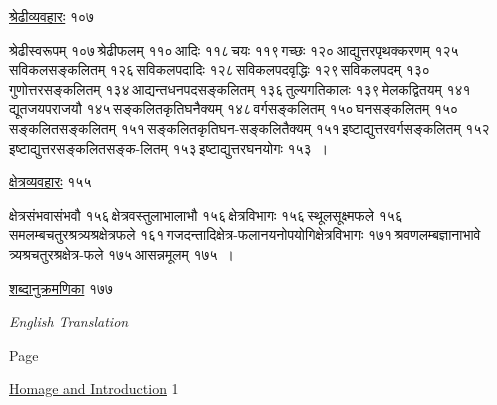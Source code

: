 \documentclass[10pt, openany]{book}
\begin{document}
\vspace{2mm}

\noindent \hyperref[shre]{श्रेढीव्यवहारः}  \hfill १०७

\vspace{2mm}

\begin{minipage}{0.8\textwidth}
 श्रेढीस्वरूपम् १०७\textemdash \,श्रेढीफलम् ११०\textemdash \,आदिः ११८\textemdash \,चयः ११९\textemdash \,गच्छः १२०\textemdash \,आद्युत्तरपृथक्करणम् १२५\textemdash \,सविकलसङ्कलितम् १२६\textemdash \,सविकलपदादिः १२८\textemdash \,सविकलपदवृद्धिः १२९\textemdash \,सविकलपदम् १३०\textemdash \,गुणोत्तरसङ्कलितम् १३४\textemdash \,आद्यन्तधनपदसङ्कलितम् १३६\textemdash \,तुल्यगतिकालः १३९\textemdash \,मेलकद्वितयम् १४१\textemdash \,द्यूतजयपराजयौ १४५\textemdash \,सङ्कलितकृतिघनैक्यम् १४८\textemdash \,वर्गसङ्कलितम् १५०\textemdash \,घनसङ्कलितम् १५०\textemdash \,सङ्कलितसङ्कलितम् १५१\textemdash \,सङ्कलितकृतिघन-सङ्कलितैक्यम् १५१\textemdash \,इष्टाद्युत्तरवर्गसङ्कलितम् १५२\textemdash \,इष्टाद्युत्तरसङ्कलितसङ्क-लितम् १५३\textemdash \,इष्टाद्युत्तरघनयोगः १५३~। 
\end{minipage}


\vspace{2mm}

\noindent \hyperref[kshe]{क्षेत्रव्यवहारः} \hfill १५५  

\vspace{2mm}

\begin{minipage}{0.8\textwidth}
 क्षेत्रसंभवासंभवौ १५६\textemdash \,क्षेत्रवस्तुलाभालाभौ १५६\textemdash \,क्षेत्रविभागः १५६\textemdash \,स्थूलसूक्ष्मफले १५६\textemdash \,समलम्बचतुरश्रत्र्यश्रक्षेत्रफले १६१\textemdash \,गजदन्तादिक्षेत्र-फलानयनोपयोगिक्षेत्रविभागः १७१\textemdash \,श्रवणलम्बज्ञानाभावे त्र्यश्रचतुरश्रक्षेत्र-फले १७५\textemdash \,आसन्नमूलम् १७५~। 
\end{minipage}

\vspace{2mm}

\noindent \hyperref[anu]{शब्दानुक्रमणिका} \hfill १७७ 

\newpage

\begin{center}
\englishfont\emph{{\large English Translation}}
\end{center}

\hfill Page 

\noindent \hyperref[hom]{Homage and Introduction}  \hfill 1

\vspace{2mm}
\end{document}
